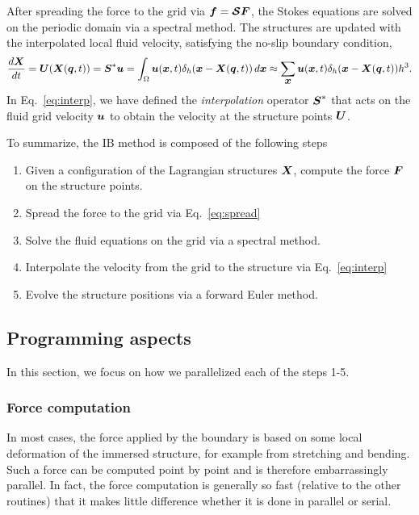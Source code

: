 \documentclass[]{article}
\newcommand{\bm}[1]{\mbox{\boldmath $ #1 $}}    %
\begin{document}
After spreading the force to the grid via $\bm{f}=\bm{\mathcal{S}}\bm{F}$, the Stokes equations are solved on the periodic domain via a spectral method. The structures are updated with the interpolated local fluid velocity, satisfying the no-slip boundary condition,
\begin{equation}
\label{eq:interp}
\frac{d \bm{X}}{dt} = \bm{U}(\bm{X}(\bm{q},t)) =\bm{S}^* \bm{u} = \int_{\Omega} \bm{u} (\bm{x},t) \delta_h(\bm{x}-\bm{X}(\bm{q},t))\, d\bm{x} \approx \sum_{\bm{x}} \bm{u}(\bm{x},t) \delta_h (\bm{x} - \bm{X}(\bm{q},t)) h^3. 
\end{equation}
In Eq.\ \eqref{eq:interp}, we have defined the \textit{interpolation} operator $\bm{S}^*$ that acts on the fluid grid velocity $\bm{u}$ to obtain the velocity at the structure points $\bm{U}$. 

To summarize, the IB method is composed of the following steps
\begin{enumerate}
\item Given a configuration of the Lagrangian structures $\bm{X}$, compute the force $\bm{F}$ on the structure points. 
\item Spread the force to the grid via Eq.\ \eqref{eq:spread}
\item Solve the fluid equations on the grid via a spectral method. 
\item Interpolate the velocity from the grid to the structure via Eq.\ \eqref{eq:interp}
\item Evolve the structure positions via a forward Euler method. 
\end{enumerate}

\subsection{Programming aspects}
In this section, we focus on how we parallelized each of the steps 1-5. 

\subsubsection{Force computation}
In most cases, the force applied by the boundary is based on some local deformation of the immersed structure, for example from stretching and bending. Such a force can be computed point by point and is therefore embarrassingly parallel. In fact, the force computation is generally so fast (relative to the other routines) that it makes little difference whether it is done in parallel or serial. 
\end{document}
